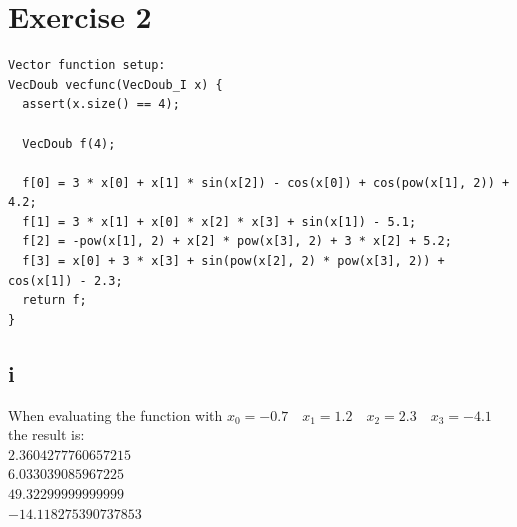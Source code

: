 \documentclass{article}
\begin{document}
\newpage
\section*{Exercise 2}
\begin{verbatim}
Vector function setup:
VecDoub vecfunc(VecDoub_I x) {
  assert(x.size() == 4);

  VecDoub f(4);

  f[0] = 3 * x[0] + x[1] * sin(x[2]) - cos(x[0]) + cos(pow(x[1], 2)) + 4.2;
  f[1] = 3 * x[1] + x[0] * x[2] * x[3] + sin(x[1]) - 5.1;
  f[2] = -pow(x[1], 2) + x[2] * pow(x[3], 2) + 3 * x[2] + 5.2;
  f[3] = x[0] + 3 * x[3] + sin(pow(x[2], 2) * pow(x[3], 2)) + cos(x[1]) - 2.3;
  return f;
}
\end{verbatim}

\subsection*{i}
When evaluating the function with $x_0=-0.7\quad x_1=1.2\quad x_2=2.3\quad x_3=-4.1$ the result is:\\
$2.3604277760657215$\\
$6.033039085967225$\\
$49.32299999999999$\\
$-14.118275390737853$
\end{document}

